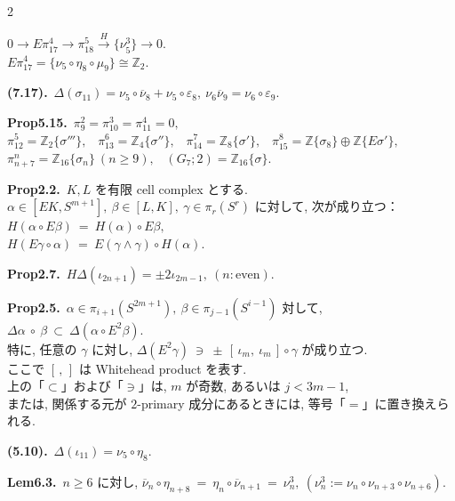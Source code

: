 \documentclass[10pt, leqno]{ltjsarticle}
\newcommand{\ov}[1]{\overline{#1}}
\newcommand{\gen}[1]{\{#1\}}       %
\numberwithin{equation}{section}
\theoremstyle{plain}
\theoremstyle{definition}
\theoremstyle{remark}
\begin{document}
\begin{paracol}{2}
\switchcolumn

\noindent
\(
0\longrightarrow E\pi_{17}^{4}\xrightarrow{\ \ } \pi_{18}^{5}
 \xrightarrow{\,H\,} \gen{\nu_5^{3}}\longrightarrow 0 .
\)\\
\(E\pi_{17}^4
= \gen{\nu_5\circ\eta_8\circ\mu_9}
\cong \mathbb{Z}_2 .\)

\noindent
\textbf{(7.17).}\
\(\Delta(\sigma_{11}) = \nu_5\circ\ov{\nu}_8 + \nu_5\circ\varepsilon_8,\
\nu_6\ov{\nu}_9 = \nu_6\circ\varepsilon_9 .\)

\noindent
\textbf{Prop5.15.}\
\(\pi_9^2=\pi_{10}^3=\pi_{11}^4=0,\) \\
\(\pi^{5}_{12}=\mathbb Z_2\gen{\sigma'''},\) \
\(\pi^{6}_{13}=\mathbb Z_4\gen{\sigma''},\) \
\(\pi^{7}_{14}=\mathbb Z_8\gen{\sigma'},\) \
\(\pi^{8}_{15}=\mathbb Z\gen{\sigma_8}\oplus\mathbb Z\gen{E\sigma'},\) \\
\(\pi^{n}_{n+7}=\mathbb Z_{16}\gen{\sigma_n}\ (n\ge9),\) \
\((G_{7};2)=\mathbb Z_{16}\gen{\sigma}.\)

\noindent
\textbf{Prop2.2.}\
$K,L$ を有限 cell complex とする. \\
$\alpha\in[EK, S^{m+1}], \ \beta\in[L,K], \ \gamma\in\pi_r(S^r)$ 
に対して, 次が成り立つ：\\
\(
H(\alpha\circ E\beta)\ =\ H(\alpha)\circ E\beta,
\)\\
\(
H(E\gamma\circ\alpha)\ =\ E(\gamma\wedge\gamma)\circ H(\alpha).
\)

\noindent
\textbf{Prop2.7.}\
\(H\Delta(\iota_{2n+1}) = \pm2\iota_{2m-1},\ (n:\text{even})\).

\noindent
\textbf{Prop2.5.}\
$\alpha\in\pi_{i+1}(S^{2m+1}), \ \beta\in \pi_{j-1}(S^{i-1})$ 対して, 
\(
\Delta\alpha\ \circ\ \beta\ \subset\ \Delta(\alpha\circ E^2\beta).
\)\\
特に, 任意の $\gamma$ に対し,
\(
\Delta(E^2\gamma)\ \ni\ \pm\,[\,\iota_m,\ \iota_m\,]\circ\gamma
\)
が成り立つ. \\
ここで $[\, ,\,]$ は Whitehead product を表す. \\
上の「$\subset$」および「$\ni$」は, $m$ が奇数, 
あるいは $j<3m-1$, \\
または, 関係する元が \(2\)-primary 成分にあるときには, 
等号「$=$」に置き換えられる. 

\noindent
\textbf{(5.10).}\
\(\Delta(\iota_{11})=\nu_5\circ\eta_8 .\)

\noindent
\textbf{Lem6.3.}\
\(n\ge6\) に対し,
\(
\overline\nu_n\circ \eta_{n+8}\ 
=\ \eta_n\circ \overline\nu_{n+1}\ =\ \nu_n^{3},
\ (\nu_n^{3}:=\nu_n\circ \nu_{n+3}\circ \nu_{n+6}).
\)


\end{paracol}
\end{document}
